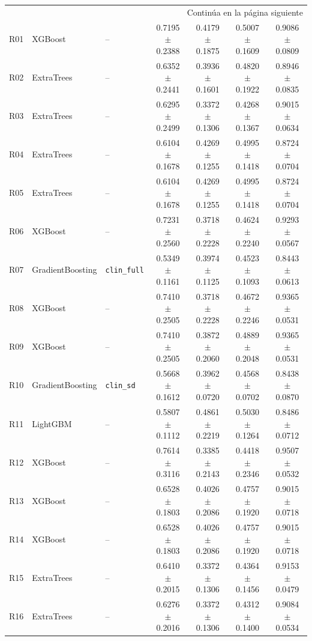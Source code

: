 \begin{landscape}
\begin{longtable}{rllcccc}
\midrule
\multicolumn{7}{r}{Continúa en la página siguiente} \\
\endfoot
\bottomrule
\endlastfoot
R01 & XGBoost & -- & 0.7195 $\pm$ 0.2388 & 0.4179 $\pm$ 0.1875 & 0.5007 $\pm$ 0.1609 & 0.9086 $\pm$ 0.0809 \\
R02 & ExtraTrees & -- & 0.6352 $\pm$ 0.2441 & 0.3936 $\pm$ 0.1601 & 0.4820 $\pm$ 0.1922 & 0.8946 $\pm$ 0.0835 \\
R03 & ExtraTrees & -- & 0.6295 $\pm$ 0.2499 & 0.3372 $\pm$ 0.1306 & 0.4268 $\pm$ 0.1367 & 0.9015 $\pm$ 0.0634 \\
R04 & ExtraTrees & -- & 0.6104 $\pm$ 0.1678 & 0.4269 $\pm$ 0.1255 & 0.4995 $\pm$ 0.1418 & 0.8724 $\pm$ 0.0704 \\
R05 & ExtraTrees & -- & 0.6104 $\pm$ 0.1678 & 0.4269 $\pm$ 0.1255 & 0.4995 $\pm$ 0.1418 & 0.8724 $\pm$ 0.0704 \\
R06 & XGBoost & -- & 0.7231 $\pm$ 0.2560 & 0.3718 $\pm$ 0.2228 & 0.4624 $\pm$ 0.2240 & 0.9293 $\pm$ 0.0567 \\
R07 & GradientBoosting & \texttt{clin\_full} & 0.5349 $\pm$ 0.1161 & 0.3974 $\pm$ 0.1125 & 0.4523 $\pm$ 0.1093 & 0.8443 $\pm$ 0.0613 \\
R08 & XGBoost & -- & 0.7410 $\pm$ 0.2505 & 0.3718 $\pm$ 0.2228 & 0.4672 $\pm$ 0.2246 & 0.9365 $\pm$ 0.0531 \\
R09 & XGBoost & -- & 0.7410 $\pm$ 0.2505 & 0.3872 $\pm$ 0.2060 & 0.4889 $\pm$ 0.2048 & 0.9365 $\pm$ 0.0531 \\
R10 & GradientBoosting & \texttt{clin\_sd} & 0.5668 $\pm$ 0.1612 & 0.3962 $\pm$ 0.0720 & 0.4568 $\pm$ 0.0702 & 0.8438 $\pm$ 0.0870 \\
R11 & LightGBM & -- & 0.5807 $\pm$ 0.1112 & 0.4861 $\pm$ 0.2219 & 0.5030 $\pm$ 0.1264 & 0.8486 $\pm$ 0.0712 \\
R12 & XGBoost & -- & 0.7614 $\pm$ 0.3116 & 0.3385 $\pm$ 0.2143 & 0.4418 $\pm$ 0.2346 & 0.9507 $\pm$ 0.0532 \\
R13 & XGBoost & -- & 0.6528 $\pm$ 0.1803 & 0.4026 $\pm$ 0.2086 & 0.4757 $\pm$ 0.1920 & 0.9015 $\pm$ 0.0718 \\
R14 & XGBoost & -- & 0.6528 $\pm$ 0.1803 & 0.4026 $\pm$ 0.2086 & 0.4757 $\pm$ 0.1920 & 0.9015 $\pm$ 0.0718 \\
R15 & ExtraTrees & -- & 0.6410 $\pm$ 0.2015 & 0.3372 $\pm$ 0.1306 & 0.4364 $\pm$ 0.1456 & 0.9153 $\pm$ 0.0479 \\
R16 & ExtraTrees & -- & 0.6276 $\pm$ 0.2016 & 0.3372 $\pm$ 0.1306 & 0.4312 $\pm$ 0.1400 & 0.9084 $\pm$ 0.0534 \\

\end{longtable}
\end{landscape}
